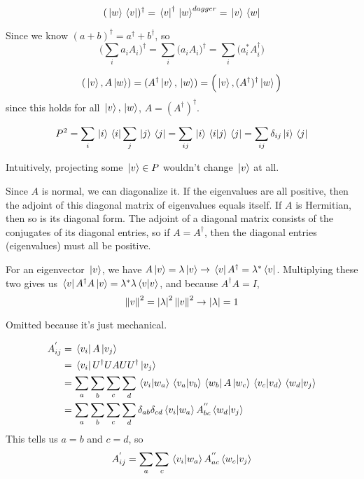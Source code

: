 \exercise
$$(\ket*{w} \bra*{v})^{\dagger} = \bra*{v}^{\dagger} \ket*{w}^{dagger} = \ket*{v} \bra*{w}$$

\exercise
Since we know $(a + b)^{\dagger} = a^{\dagger} + b^{\dagger}$, so $$\Big( \sum_{i} a_{i} A_{i} \Big)^{\dagger} = \sum_{i} \Big( a_{i} A_{i} \Big)^{\dagger} = \sum_{i} \Big( a_{i}^{*} A_{i}^{\dagger} \Big)$$

\exercise
$$(\ket*{v}, A\ket*{w}) = (A^{\dagger} \ket*{v}, \ket*{w}) = \Big(\ket*{v}, (A^{\dagger})^{\dagger} \ket*{w} \Big)$$
since this holds for all $\ket*{v}, \ket*{w}$, $A = (A^{\dagger})^{\dagger}$. 

\exercise
$$P^{2} = \sum_{i} \ket*{i} \bra*{i} \sum_{j} \ket*{j} \bra*{j} = \sum_{ij} \ket*{i} \braket*{i}{j} \bra*{j} = \sum_{ij} \delta_{ij} \ket*{i} \bra*{j}$$

Intuitively, projecting some $\ket*{v} \in P $ wouldn't change $\ket*{v}$ at all. 

\exercise
Since $A$ is normal, we can diagonalize it. If the eigenvalues are all positive, then the adjoint of this diagonal matrix of eigenvalues equals itself. If $A$ is Hermitian, then so is its diagonal form. The adjoint of a diagonal matrix consists of the conjugates of its diagonal entries, so if $A = A^{\dagger}$, then the diagonal entries (eigenvalues) must all be positive. 

\exercise
For an eigenvector $\ket*{v}$, we have $A \ket*{v} = \lambda \ket*{v} \rightarrow \bra*{v} A^{\dagger} = \lambda^{*} \bra*{v}$. Multiplying these two gives us $\bra*{v} A^{\dagger} A \ket*{v} = \lambda^{*} \lambda \braket*{v}{v}$, and because $A^{\dagger} A  = I$, 
$$\norm{v}^{2} = \abs{\lambda}^{2} \, \norm{v}^{2} \rightarrow \abs{\lambda} = 1$$

\exercise
Omitted because it's just mechanical. 

\exercise
$$
\begin{aligned}
A^{'}_{ij} &= \bra*{v_{i}} A \ket*{v_{j}}\\ &= \bra*{v_{i}} U^{\dagger} U A U U^{\dagger} \ket*{v_{j}} \\
&= \sum_{a} \sum_{b} \sum_{c} \sum_{d} \braket*{v_{i}}{w_{a}} \braket*{v_{a}}{v_{b}} \bra*{w_{b}} A \ket*{w_{c}} \braket*{v_{c}}{v_{d}} \braket*{w_{d}}{v_{j}} \\
&= \sum_{a} \sum_{b} \sum_{c} \sum_{d} \delta_{ab} \delta_{cd} \braket*{v_{i}}{w_{a}} A^{''}_{bc} \braket*{w_{d}}{v_{j}} 
\end{aligned}
$$
This tells us $a = b$ and $c = d$, so 
$$A^{'}_{ij} = \sum_{a} \sum_{c} \braket*{v_{i}}{w_{a}} A^{''}_{ac} \braket*{w_{c}}{v_{j}} $$


